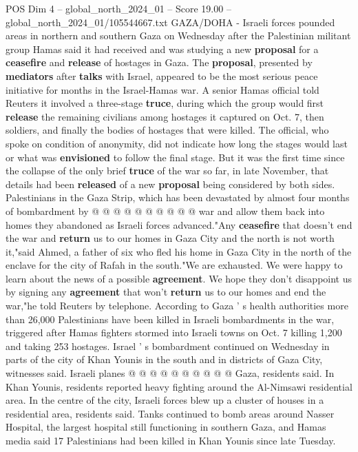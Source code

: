\begin{textsample}{POS Dim 4 – global\_north\_2024\_01 – Score 19.00 – global\_north\_2024\_01/105544667.txt}  \label{ex:f4_pos_336}
GAZA/DOHA - Israeli forces pounded areas in northern and southern Gaza on Wednesday after the Palestinian militant group Hamas said it had received and was studying a new \textbf{proposal} for a \textbf{ceasefire} and \textbf{release} of hostages in Gaza.
The \textbf{proposal}, presented by \textbf{mediators} after \textbf{talks} with Israel, appeared to be the most serious peace initiative for months in the Israel-Hamas war.
A senior Hamas official told Reuters it involved a three-stage \textbf{truce}, during which the group would first \textbf{release} the remaining civilians among hostages it captured on Oct. 7, then soldiers, and finally the bodies of hostages that were killed.
The official, who spoke on condition of anonymity, did not indicate how long the stages would last or what was \textbf{envisioned} to follow the final stage.
But it was the first time since the collapse of the only brief \textbf{truce} of the war so far, in late November, that details had been \textbf{released} of a new \textbf{proposal} being considered by both sides.
Palestinians in the Gaza Strip, which has been devastated by almost four months of bombardment by @ @ @ @ @ @ @ @ @ @ war and allow them back into homes they abandoned as Israeli forces advanced."Any \textbf{ceasefire} that doesn't end the war and \textbf{return} us to our homes in Gaza City and the north is not worth it,"said Ahmed, a father of six who fled his home in Gaza City in the north of the enclave for the city of Rafah in the south."We are exhausted.
We were happy to learn about the news of a possible \textbf{agreement}.
We hope they don't disappoint us by signing any \textbf{agreement} that won't \textbf{return} us to our homes and end the war,"he told Reuters by telephone.
According to Gaza ' s health authorities more than 26,000 Palestinians have been killed in Israeli bombardments in the war, triggered after Hamas fighters stormed into Israeli towns on Oct. 7 killing 1,200 and taking 253 hostages.
Israel ' s bombardment continued on Wednesday in parts of the city of Khan Younis in the south and in districts of Gaza City, witnesses said.
Israeli planes @ @ @ @ @ @ @ @ @ @ Gaza, residents said.
In Khan Younis, residents reported heavy fighting around the Al-Nimsawi residential area.
In the centre of the city, Israeli forces blew up a cluster of houses in a residential area, residents said.
Tanks continued to bomb areas around Nasser Hospital, the largest hospital still functioning in southern Gaza, and Hamas media said 17 Palestinians had been killed in Khan Younis since late Tuesday.

\end{textsample}
